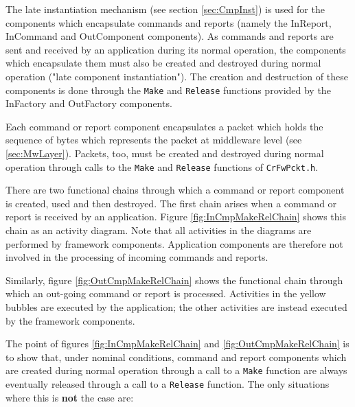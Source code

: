 \documentclass[a4paper,10pt]{article}
\begin{document}
The late instantiation mechanism (see section \ref{sec:CmpInst}) is used for the components which encapsulate commands and reports (namely the InReport, InCommand and OutComponent components). As commands and reports are sent and received by an application during its normal operation, the components which encapsulate them must also be created and destroyed during normal operation ("late component instantiation"). The creation and destruction of these components is done through the \texttt{Make} and \texttt{Release} functions provided by the InFactory and OutFactory components.

Each command or report component encapsulates a packet which holds the sequence of bytes which represents the packet at middleware level (see \ref{sec:MwLayer}). Packets, too, must be created and destroyed during normal operation through calls to the \texttt{Make} and \texttt{Release} functions of \texttt{CrFwPckt.h}.

There are two functional chains through which a command or report component is created, used and then destroyed. The first chain arises when a command or report is received by an application. Figure \ref{fig:InCmpMakeRelChain} shows this chain as an activity diagram. Note that all activities in the diagrams are performed by framework components. Application components are therefore not involved in the processing of incoming commands and reports.

Similarly, figure \ref{fig:OutCmpMakeRelChain} shows the functional chain through which an out-going command or report is processed. Activities in the yellow bubbles are executed by the application; the other activities are instead executed by the framework components. 

The point of figures \ref{fig:InCmpMakeRelChain} and \ref{fig:OutCmpMakeRelChain} is to show that, under nominal conditions, command and report components which are created during normal operation through a call to a \texttt{Make} function are always eventually released through a call to a \texttt{Release} function. The only situations where this is \textbf{not} the case are:
\end{document}
